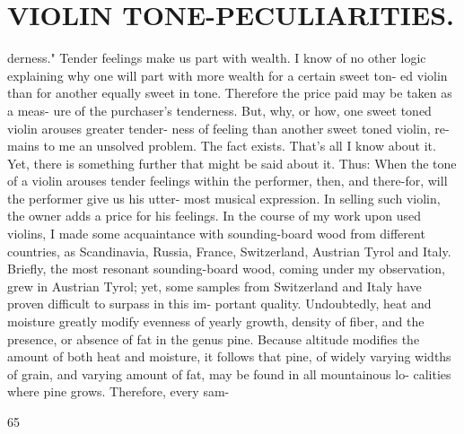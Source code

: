 \documentclass{article}
\begin{document}
\section*{VIOLIN TONE-PECULIARITIES.}
derness." Tender feelings make us part with wealth. I know of no other logic explaining why one will part with more wealth for a certain sweet ton- ed violin than for another equally sweet in tone. Therefore the price paid may be taken as a meas- ure of the purchaser's tenderness. But, why, or how, one sweet toned violin arouses greater tender- ness of feeling than another sweet toned violin, re- mains to me an unsolved problem. The fact exists. That's all I know about it. Yet, there is something further that might be said about it. Thus: When the tone of a violin arouses tender feelings within the performer, then, and there-for, will the performer give us his utter- most musical expression. In selling such violin, the owner adds a price for his feelings. In the course of my work upon used violins, I made some acquaintance with sounding-board wood from different countries, as Scandinavia, Russia, France, Switzerland, Austrian Tyrol and Italy. Briefly, the most resonant sounding-board wood, coming under my observation, grew in Austrian Tyrol; yet, some samples from Switzerland and Italy have proven difficult to surpass in this im- portant quality. Undoubtedly, heat and moisture greatly modify evenness of yearly growth, density of fiber, and the presence, or absence of fat in the genus pine. Because altitude modifies the amount of both heat and moisture, it follows that pine, of widely varying widths of grain, and varying amount of fat, may be found in all mountainous lo- calities where pine grows. Therefore, every sam-

65
\end{document}

